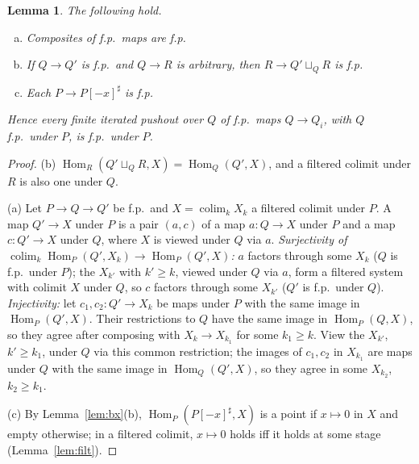 \documentclass[11pt]{article}
\newtheorem{lemma}[theorem]{Lemma}
\theoremstyle{definition}
\theoremstyle{remark}
\newcommand{\Hom}{\operatorname{Hom}}
\newcommand{\colim}{\operatorname*{colim}}
\begin{document}
\begin{lemma}\label{lem:fp}
The following hold.
\begin{enumerate}[(a)]
\item Composites of f.p.\ maps are f.p.
\item If $Q\to Q'$ is f.p.\ and $Q\to R$ is arbitrary, then $R\to Q'\sqcup_Q R$ is f.p.
\item Each $P\to P[-x]^\sharp$ is f.p.
\end{enumerate}
Hence every finite iterated pushout over $Q$ of f.p.\ maps $Q\to Q_i$, with $Q$ f.p.\ under $P$, is f.p.\ under $P$.
\end{lemma}
\begin{proof}
(b) $\Hom_R(Q'\sqcup_Q R,X)=\Hom_Q(Q',X)$, and a filtered colimit under $R$ is also one under $Q$.

(a) Let $P\to Q\to Q'$ be f.p.\ and $X=\colim_k X_k$ a filtered colimit under $P$. A map $Q'\to X$ under $P$ is a pair $(a,c)$ of a map $a\colon Q\to X$ under $P$ and a map $c\colon Q'\to X$ under $Q$, where $X$ is viewed under $Q$ via $a$.
\emph{Surjectivity of $\colim_k\Hom_P(Q',X_k)\to\Hom_P(Q',X)$:} $a$ factors through some $X_k$ ($Q$ is f.p.\ under $P$); the $X_{k'}$ with $k'\ge k$, viewed under $Q$ via $a$, form a filtered system with colimit $X$ under $Q$, so $c$ factors through some $X_{k'}$ ($Q'$ is f.p.\ under $Q$).
\emph{Injectivity:} let $c_1,c_2\colon Q'\to X_k$ be maps under $P$ with the same image in $\Hom_P(Q',X)$. Their restrictions to $Q$ have the same image in $\Hom_P(Q,X)$, so they agree after composing with $X_k\to X_{k_1}$ for some $k_1\ge k$. View the $X_{k'}$, $k'\ge k_1$, under $Q$ via this common restriction; the images of $c_1,c_2$ in $X_{k_1}$ are maps under $Q$ with the same image in $\Hom_Q(Q',X)$, so they agree in some $X_{k_2}$, $k_2\ge k_1$.

(c) By Lemma~\ref{lem:bx}(b), $\Hom_P(P[-x]^\sharp,X)$ is a point if $x\mapsto0$ in $X$ and empty otherwise; in a filtered colimit, $x\mapsto 0$ holds iff it holds at some stage (Lemma~\ref{lem:filt}).
\end{proof}
\end{document}
